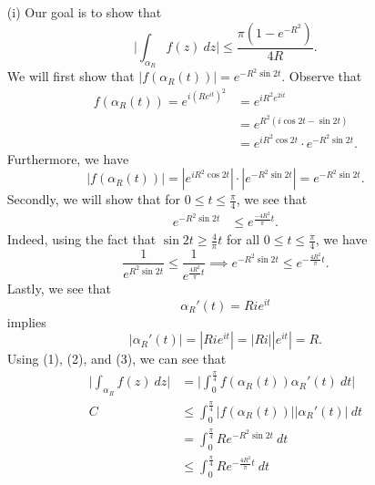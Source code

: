 \documentclass[a4paper]{article}
\begin{document}
\begin{solution}
\begin{enumerate}
    \item[(i)] Our goal is to show that 
           \[  \Big| \int_{ {\alpha}_{R} }^{  } f(z) \ dz   \Big|  \leq \frac{ \pi (1 - e^{- R^{2}}) }{ 4 R }. \]
        We will first show that \( | f(\alpha_R(t)) | = e^{-R^{2} \sin 2 t} \). Observe that 
        \begin{align*}
            f({\alpha}_{R}(t)) = e^{i(R  e^{it })^{2}} &= e^{i R^{2} e^{2it}} \\
                                                       &= e^{R^{2} (i \cos 2 t - \sin 2 t)} \\
                                                       &= e^{i R^{2} \cos 2 t} \cdot e^{- R^{2} \sin 2t}.
        \end{align*}
        Furthermore, we have 
        \[  | f({\alpha}_{R}(t)) | = | e^{i R^{2} \cos 2t } | \cdot | e^{- R^{2} \sin 2t} | = e^{- R^{2} \sin 2t} \tag{1}.  \]
        Secondly, we will show that for \( 0 \leq t \leq \frac{ \pi  }{ 4  }  \), we see that 
        \begin{align*}
            e^{- R^{2} \sin 2t } &\leq  e^{\frac{ -4 R^{2} }{ \pi  } t }.
        \end{align*}
        Indeed, using the fact that \( \sin 2t \geq \frac{ 4  }{ \pi  } t  \) for all \( 0 \leq t \leq \frac{ \pi }{ 4 }  \), we have
        \[  \frac{ 1 }{ e^{R^{2} \sin 2t } }  \leq \frac{ 1  }{ e^{\frac{ 4 R^{2} }{ \pi  } t } } \implies e^{- R^{2} \sin 2t } \leq e^{- \frac{ 4 R^{2} }{ \pi  } t }. \tag{2} \]
        Lastly, we see that 
        \[  {\alpha}_{R}'(t) = R i e^{it }  \] implies
        \[  | {\alpha}_{R}'(t) | = | R i e^{it } | =   | Ri | | e^{it } |  = R. \tag{3} \]
        Using (1), (2), and (3), we can see that
        \begin{align*}
            \Big| \int_{ {\alpha}_{R} }^{  } f(z) \ dz  \Big| &= \Big| \int_{ 0 }^{ \frac{ \pi }{ 4 }  } f({\alpha}_{R}(t)) {\alpha}_{R}'(t) \ dt  \Big|  \\C 
                                                              &\leq \int_{ 0 }^{ \frac{ \pi }{ 4 }  } | f({\alpha}_{R}(t)) | | {\alpha}_{R}'(t) |  \ dt \\
                                                              &= \int_{ 0 }^{ \frac{ \pi }{ 4 }  } R e^{- R^{2} \sin 2t } \ dt \\
                                                              &\leq \int_{ 0 }^{  \frac{ \pi }{ 4 }  } R e^{-\frac{ 4 R^{2} }{ \pi  } t } \ dt \\

\end{align*}
\end{enumerate}
\end{solution}
\end{document}
